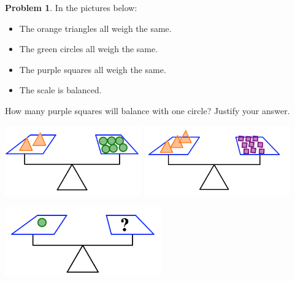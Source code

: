 \documentclass[12pt, reqno]{amsart}
\theoremstyle{remark}
\theoremstyle{definition}
\newtheorem{problem}{Problem}
\numberwithin{equation}{section}  %
\begin{document}
\bigskip

\begin{problem}\label{prob: balance1}
In the pictures below:
\begin{itemize}
\item
The orange triangles all weigh the same.  
\item
The green circles all weigh the same.  
\item
The purple squares all weigh the same.  
\item
The scale is balanced.
\end{itemize}
How many purple squares will balance with one circle?  Justify your answer.
\begin{center}
\includegraphics[height=3cm]{balance1a}\quad
\includegraphics[height=3cm]{balance1b}

\includegraphics[height=3cm]{balance1c}

\end{center}

\end{problem}

\bigskip
\end{document}
